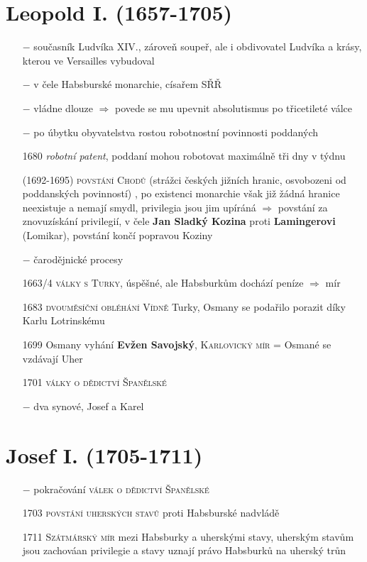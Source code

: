 \documentclass{article}
\begin{document}
\section*{Leopold I. (1657-1705)}
\begin{itemize}
    \vspace{-0.5em}
    \setlength\itemsep{0.15em}
    \item[$-$] současník Ludvíka XIV., zároveň soupeř, ale i obdivovatel Ludvíka a krásy, kterou ve Versailles vybudoval
    \item[$-$] v čele Habsburské monarchie, císařem SŘŘ
    \item[$-$] vládne dlouze $\Rightarrow$ povede se mu upevnit absolutismus po třicetileté válce
    \item[$-$] po úbytku obyvatelstva rostou robotnostní povinnosti poddaných
    \item[1680] \textit{robotní patent}, poddaní mohou robotovat maximálně tři dny v týdnu
    \item[(1692-1695)] \textsc{povstání Chodů} (strážci českých jižních hranic, osvobozeni od poddanských povinností) , po existenci monarchie však již žádná hranice neexistuje a nemají smydl, privilegia jsou jim upíráná $\Rightarrow$ povstání za znovuzískání privilegií, v čele \textbf{Jan Sladký Kozina} proti \textbf{Lamingerovi} (Lomikar), povstání končí popravou Koziny
    \item[$-$] čarodějnické procesy
    \item[1663/4] \textsc{války s Turky}, úspěšné, ale Habsburkům dochází peníze $\Rightarrow$ mír
    \item[1683]  \textsc{dvouměsíční obléhání Vídně} Turky, Osmany se podařilo porazit díky Karlu Lotrinskému
    \item[1699] Osmany vyhání \textbf{Evžen Savojský}, \textsc{Karlovický mír} = Osmané se vzdávají Uher
    \item[1701] \textsc{války o dědictví Španělské}
    \item[$-$] dva synové, Josef a Karel

\end{itemize}


\section*{Josef I. (1705-1711)}
\begin{itemize}
    \vspace{-0.5em}
    \setlength\itemsep{0.15em}
    \item[$-$] pokračování \textsc{válek o dědictví Španělské}
    \item[1703] \textsc{povstání uherských stavů} proti Habsburské nadvládě
    \item[1711] \textsc{Szátmárský mír} mezi Habsburky a uherskými stavy, uherským stavům jsou zachováan privilegie a stavy uznají právo Habsburků na uherský trůn
\end{itemize}
\end{document}

